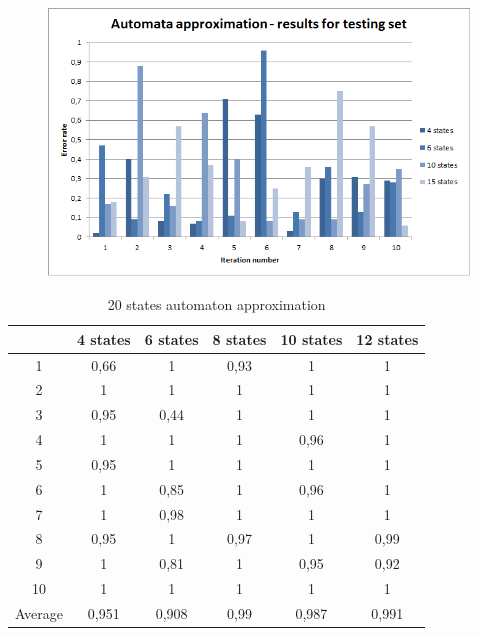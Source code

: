 \documentclass[runningheads,a4paper]{llncs}
\begin{document}
\begin{figure}
\centering
\includegraphics[scale=1]{1.png}
\end{figure}

\begin{table}[]
\centering
\caption{20 states automaton approximation}
\label{my-label}
\begin{tabular}{@{}cccccc@{}}
\toprule
        & 4 states & 6 states & 8 states & 10 states & 12 states    \\ \midrule
1       & 0,66     & 1        & 0,93     & 1         & 1 \\
2       & 1        & 1        & 1        & 1         & 1 \\
3       & 0,95     & 0,44     & 1        & 1         & 1 \\
4       & 1        & 1        & 1        & 0,96      & 1   \\
5       & 0,95     & 1        & 1        & 1         & 1   \\
6       & 1        & 0,85     & 1        & 0,96      & 1    \\
7       & 1        & 0,98     & 1        & 1         & 1    \\
8       & 0,95     & 1        & 0,97     & 1         & 0,99     \\
9       & 1        & 0,81     & 1        & 0,95      & 0,92 \\
10      & 1        & 1        & 1        & 1         & 1  \\
Average & 0,951    & 0,908    & 0,99     & 0,987     & 0,991  \\ \bottomrule
\end{tabular}
\end{table}
\end{document}
